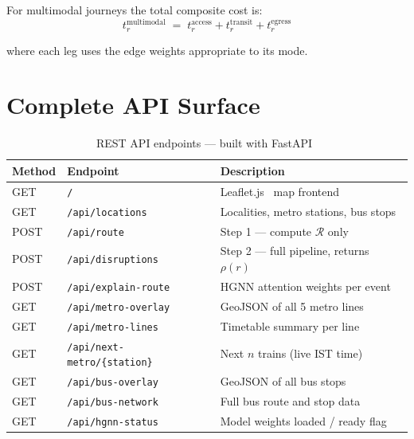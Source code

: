 For multimodal journeys the total composite cost is:
\begin{equation}
  t_r^{\text{multimodal}}
  \;=\; t_r^{\text{access}} + t_r^{\text{transit}} + t_r^{\text{egress}}
  \label{eq:multimodal}
\end{equation}

where each leg uses the edge weights appropriate to its mode.

\section{Complete API Surface}

\begin{table}[H]
\centering
\caption{REST API endpoints --- built with FastAPI~\cite{fastapi2024}}
\begin{tabular}{l l p{7cm}}
\toprule
\textbf{Method} & \textbf{Endpoint} & \textbf{Description} \\
\midrule
GET  & \texttt{/}                            & Leaflet.js~\cite{leaflet2024} map frontend \\
GET  & \texttt{/api/locations}               & Localities, metro stations, bus stops \\
POST & \texttt{/api/route}                   & Step 1 --- compute $\mathcal{R}$ only \\
POST & \texttt{/api/disruptions}             & Step 2 --- full pipeline, returns $\rho(r)$ \\
POST & \texttt{/api/explain-route}           & HGNN attention weights per event \\
GET  & \texttt{/api/metro-overlay}           & GeoJSON of all 5 metro lines \\
GET  & \texttt{/api/metro-lines}             & Timetable summary per line \\
GET  & \texttt{/api/next-metro/\{station\}}  & Next $n$ trains (live IST time) \\
GET  & \texttt{/api/bus-overlay}             & GeoJSON of all bus stops \\
GET  & \texttt{/api/bus-network}             & Full bus route and stop data \\
GET  & \texttt{/api/hgnn-status}             & Model weights loaded / ready flag \\
\bottomrule
\end{tabular}
\end{table}

